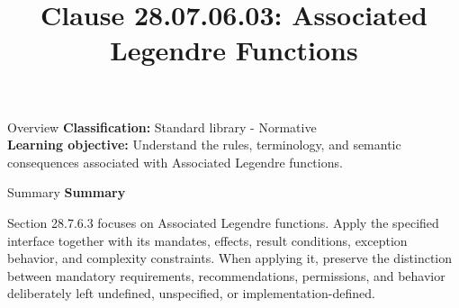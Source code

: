 \documentclass[10pt,letterpaper]{article}
\title{Clause 28.07.06.03: Associated Legendre Functions}
\author{}
\date{}
\begin{document}
\maketitle
\begin{CornellOverviewBox}{Overview}
\textbf{Classification:} Standard library - Normative\\[2pt]
\textbf{Learning objective:} Understand the rules, terminology, and semantic consequences associated with Associated Legendre functions.
\end{CornellOverviewBox}\begin{CornellSummaryBox}{Summary}
{\sffamily\bfseries\color{Accent} Summary}\par\vspace{3pt}Section 28.7.6.3 focuses on Associated Legendre functions. Apply the specified interface together with its mandates, effects, result conditions, exception behavior, and complexity constraints. When applying it, preserve the distinction between mandatory requirements, recommendations, permissions, and behavior deliberately left undefined, unspecified, or implementation-defined.
\end{CornellSummaryBox}
\end{document}
